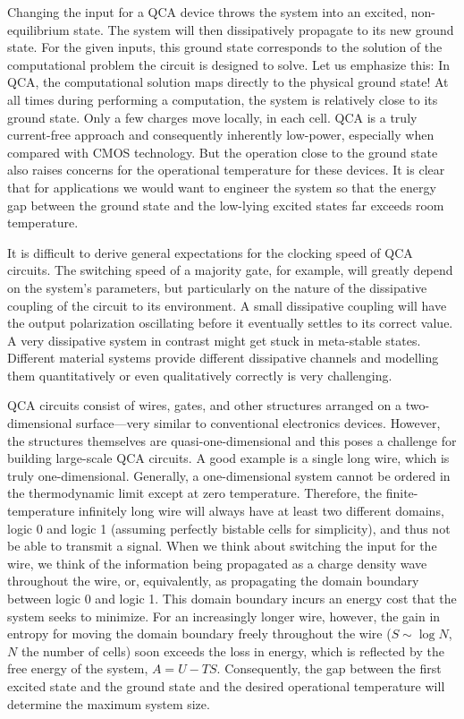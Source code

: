 Changing the input for a QCA device throws the system into an excited,
non-equilibrium state. The system will then dissipatively propagate to its new
ground state. For the given inputs, this ground state corresponds to the
solution of the computational problem the circuit is designed to solve. Let us
emphasize this: In QCA, the computational solution maps directly to the physical
ground state! At all times during performing a computation, the system is
relatively close to its ground state. Only a few charges move locally, in each
cell. QCA is a truly current-free approach and consequently inherently
low-power, especially when compared with CMOS technology. But the operation
close to the ground state also raises concerns for the operational temperature
for these devices. It is clear that for applications we would want to engineer
the system so that the energy gap between the ground state and the low-lying
excited states far exceeds room temperature.

It is difficult to derive general expectations for the clocking speed of QCA
circuits. The switching speed of a majority gate, for example, will greatly
depend on the system's parameters, but particularly on the nature of the
dissipative coupling of the circuit to its environment. A small dissipative
coupling will have the output polarization oscillating before it eventually
settles to its correct value. A very dissipative system in contrast might get
stuck in meta-stable states. Different material systems provide different
dissipative channels and modelling them quantitatively or even qualitatively
correctly is very challenging.

QCA circuits consist of wires, gates, and other structures arranged on a
two-dimensional surface---very similar to conventional electronics devices.
However, the structures themselves are quasi-one-dimensional and this poses a
challenge for building large-scale QCA circuits. A good example is a single long
wire, which is truly one-dimensional. Generally, a one-dimensional system cannot
be ordered in the thermodynamic limit except at zero temperature. Therefore, the
finite-temperature infinitely long wire will always have at least two different
domains, logic 0 and logic 1 (assuming perfectly bistable cells for simplicity),
and thus not be able to transmit a signal. When we think about switching the
input for the wire, we think of the information being propagated as a charge
density wave throughout the wire, or, equivalently, as propagating the domain
boundary between logic 0 and logic 1. This domain boundary incurs an energy cost
that the system seeks to minimize. For an increasingly longer wire, however, the
gain in entropy for moving the domain boundary freely throughout the wire ($S
\sim \log N$, $N$ the number of cells) soon exceeds the loss in energy, which is
reflected by the free energy of the system, $A = U - T S$. Consequently, the gap
between the first excited state and the ground state and the desired operational
temperature will determine the maximum system size.

